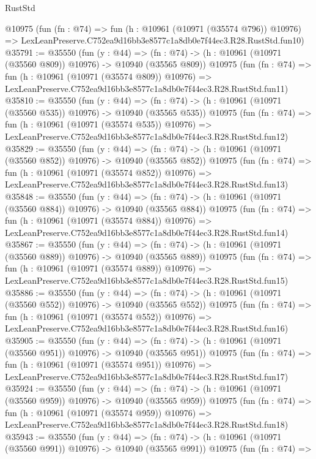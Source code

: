 \begin{lexlean}{RustStd}
\begin{coremodule}
    @10975
    (fun (fn : @74) =>
    fun (h : @10961 (@10971 (@35574 @796)) @10976) =>
    LexLeanPreserve.C752ea9d16bb3e8577c1a8db0e7f44ec3.R28.RustStd.fun10)
@35791 := @35550
    (fun (y : @44) =>
    (fn : @74) -> (h : @10961 (@10971 (@35560 @809)) @10976) -> @10940 (@35565 @809))
    @10975
    (fun (fn : @74) =>
    fun (h : @10961 (@10971 (@35574 @809)) @10976) =>
    LexLeanPreserve.C752ea9d16bb3e8577c1a8db0e7f44ec3.R28.RustStd.fun11)
@35810 := @35550
    (fun (y : @44) =>
    (fn : @74) -> (h : @10961 (@10971 (@35560 @535)) @10976) -> @10940 (@35565 @535))
    @10975
    (fun (fn : @74) =>
    fun (h : @10961 (@10971 (@35574 @535)) @10976) =>
    LexLeanPreserve.C752ea9d16bb3e8577c1a8db0e7f44ec3.R28.RustStd.fun12)
@35829 := @35550
    (fun (y : @44) =>
    (fn : @74) -> (h : @10961 (@10971 (@35560 @852)) @10976) -> @10940 (@35565 @852))
    @10975
    (fun (fn : @74) =>
    fun (h : @10961 (@10971 (@35574 @852)) @10976) =>
    LexLeanPreserve.C752ea9d16bb3e8577c1a8db0e7f44ec3.R28.RustStd.fun13)
@35848 := @35550
    (fun (y : @44) =>
    (fn : @74) -> (h : @10961 (@10971 (@35560 @884)) @10976) -> @10940 (@35565 @884))
    @10975
    (fun (fn : @74) =>
    fun (h : @10961 (@10971 (@35574 @884)) @10976) =>
    LexLeanPreserve.C752ea9d16bb3e8577c1a8db0e7f44ec3.R28.RustStd.fun14)
@35867 := @35550
    (fun (y : @44) =>
    (fn : @74) -> (h : @10961 (@10971 (@35560 @889)) @10976) -> @10940 (@35565 @889))
    @10975
    (fun (fn : @74) =>
    fun (h : @10961 (@10971 (@35574 @889)) @10976) =>
    LexLeanPreserve.C752ea9d16bb3e8577c1a8db0e7f44ec3.R28.RustStd.fun15)
@35886 := @35550
    (fun (y : @44) =>
    (fn : @74) -> (h : @10961 (@10971 (@35560 @552)) @10976) -> @10940 (@35565 @552))
    @10975
    (fun (fn : @74) =>
    fun (h : @10961 (@10971 (@35574 @552)) @10976) =>
    LexLeanPreserve.C752ea9d16bb3e8577c1a8db0e7f44ec3.R28.RustStd.fun16)
@35905 := @35550
    (fun (y : @44) =>
    (fn : @74) -> (h : @10961 (@10971 (@35560 @951)) @10976) -> @10940 (@35565 @951))
    @10975
    (fun (fn : @74) =>
    fun (h : @10961 (@10971 (@35574 @951)) @10976) =>
    LexLeanPreserve.C752ea9d16bb3e8577c1a8db0e7f44ec3.R28.RustStd.fun17)
@35924 := @35550
    (fun (y : @44) =>
    (fn : @74) -> (h : @10961 (@10971 (@35560 @959)) @10976) -> @10940 (@35565 @959))
    @10975
    (fun (fn : @74) =>
    fun (h : @10961 (@10971 (@35574 @959)) @10976) =>
    LexLeanPreserve.C752ea9d16bb3e8577c1a8db0e7f44ec3.R28.RustStd.fun18)
@35943 := @35550
    (fun (y : @44) =>
    (fn : @74) -> (h : @10961 (@10971 (@35560 @991)) @10976) -> @10940 (@35565 @991))
    @10975
    (fun (fn : @74) =>

\end{coremodule}
\end{lexlean}
